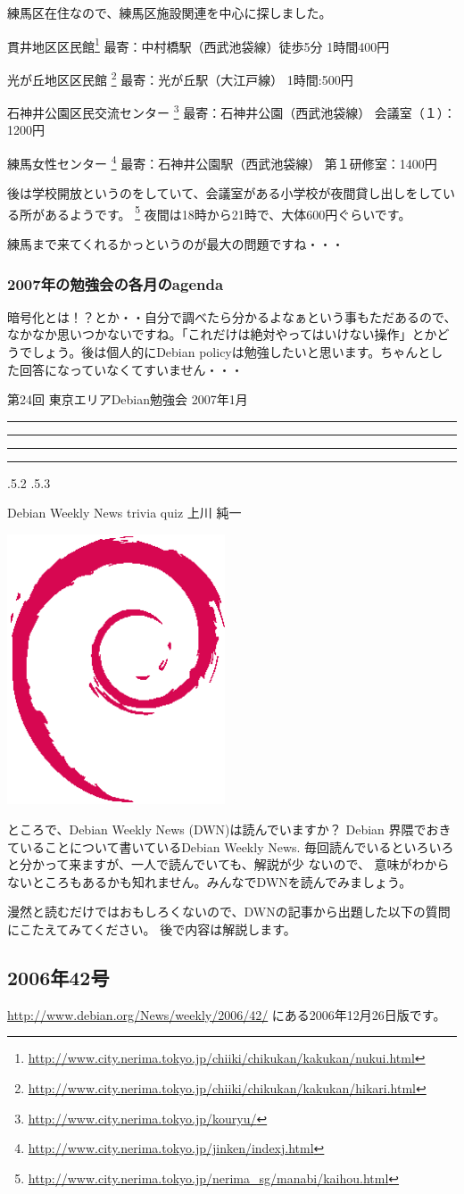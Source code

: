 \documentclass[mingoth,a4paper,twoside]{jsarticle}
\makeatletter
\newcommand{\debmtgyear}{2007}
\newcommand{\debmtgmonth}{1}
\newcommand{\debmtgnumber}{24}
\renewcommand{\section}{\@startsection{section}{1}{\z@}%
    {\Cvs \@plus.5\Cdp \@minus.2\Cdp}%
    {.5\Cvs \@plus.3\Cdp}%
    {\normalfont\gt\fontsize{32}{32}\headfont\raggedright}} %
\newcommand{\dancersection}[2]{%
\newpage
第\debmtgnumber{}回 東京エリアDebian勉強会 \debmtgyear{}年\debmtgmonth{}月
\hrule
\vspace{0.5mm}
\hrule
%
\vspace{4cm}
\hrule
\vspace{0.5mm}
\hrule
%
\vspace{-7cm}
\begin{minipage}[b]{0.7\hsize}
\section{#1}
\hfill{}#2\\
\vspace{2cm}
\end{minipage}
\begin{minipage}[b]{0.3\hsize}
\hfill{}\includegraphics[height=8cm]{image200502/openlogo-nd.eps}\\
\end{minipage}
%
\vspace{-1cm}
}
\makeatother
\begin{document}
練馬区在住なので、練馬区施設関連を中心に探しました。

貫井地区区民館\footnote{\url{http://www.city.nerima.tokyo.jp/chiiki/chikukan/kakukan/nukui.html}}
最寄：中村橋駅（西武池袋線）徒歩5分
1時間400円

光が丘地区区民館
\footnote{\url{http://www.city.nerima.tokyo.jp/chiiki/chikukan/kakukan/hikari.html}}
最寄：光が丘駅（大江戸線）
1時間:500円

石神井公園区民交流センター
\footnote{\url{http://www.city.nerima.tokyo.jp/kouryu/}}
最寄：石神井公園（西武池袋線）
会議室（１）：1200円

練馬女性センター
\footnote{\url{http://www.city.nerima.tokyo.jp/jinken/indexj.html}}
最寄：石神井公園駅（西武池袋線）
第１研修室：1400円

後は学校開放というのをしていて、会議室がある小学校が夜間貸し出しをしてい
る所があるようです。
\footnote{\url{http://www.city.nerima.tokyo.jp/nerima_sg/manabi/kaihou.html}}
夜間は18時から21時で、大体600円ぐらいです。

練馬まで来てくれるかっというのが最大の問題ですね・・・

\subsubsection{2007年の勉強会の各月のagenda}

暗号化とは！？とか・・自分で調べたら分かるよなぁという事もただあるので、
なかなか思いつかないですね。「これだけは絶対やってはいけない操作」とかど
うでしょう。後は個人的にDebian policyは勉強したいと思います。ちゃんとし
た回答になっていなくてすいません・・・



\dancersection{Debian Weekly News trivia quiz}{上川 純一}

ところで、Debian Weekly News (DWN)は読んでいますか？
Debian 界隈でおきていることについて書いているDebian Weekly News.
毎回読んでいるといろいろと分かって来ますが、一人で読んでいても、解説が少
ないので、
意味がわからないところもあるかも知れません。みんなでDWNを読んでみましょう。

漫然と読むだけではおもしろくないので、DWNの記事から出題した以下の質問にこたえてみてください。
後で内容は解説します。

\subsection{2006年42号}
\url{http://www.debian.org/News/weekly/2006/42/}
にある2006年12月26日版です。
\end{document}
